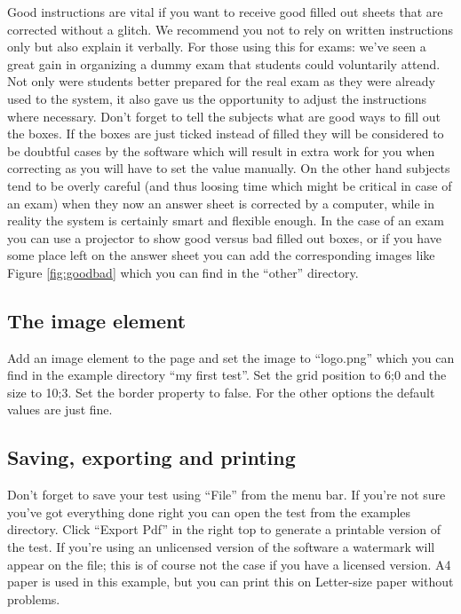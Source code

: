 \documentclass[10pt,a4paper]{article}
\begin{document}
Good instructions are vital if you want to receive good filled out sheets that are corrected without a glitch. We recommend you not to rely on written instructions only but also explain it verbally. For those using this for exams: we've seen a great gain in organizing a dummy exam that students could voluntarily attend. Not only were students better prepared for the real exam as they were already used to the system, it also gave us the opportunity to adjust the instructions where necessary. Don't forget to tell the subjects what are good ways to fill out the boxes. If the boxes are just ticked instead of filled they will be considered to be doubtful cases by the software which will result in extra work for you when correcting as you will have to set the value manually. On the other hand subjects tend to be overly careful (and thus loosing time which might be critical in case of an exam) when they now an answer sheet is corrected by a computer, while in reality the system is certainly smart and flexible enough. In the case of an exam you can use a projector to show good versus bad filled out boxes, or if you have some place left on the answer sheet you can add the corresponding images like Figure \ref{fig:goodbad} which you can find in the ``other'' directory.


\subsection*{The image element}

Add an image element to the page and set the image to ``logo.png'' which you can find in the example directory ``my first test''. Set the grid position to 6;0 and the size to 10;3. Set the border property to false. For the other options the default values are just fine.


\subsection*{Saving, exporting and printing}

Don't forget to save your test using ``File'' from the menu bar. If you're not sure you've got everything done right you can open the test from the examples directory. Click ``Export Pdf'' in the right top to generate a printable version of the test. If you're using an unlicensed version of the software a watermark will appear on the file; this is of course not the case if you have a licensed version. A4 paper is used in this example, but you can print this on Letter-size paper without problems.
\end{document}
